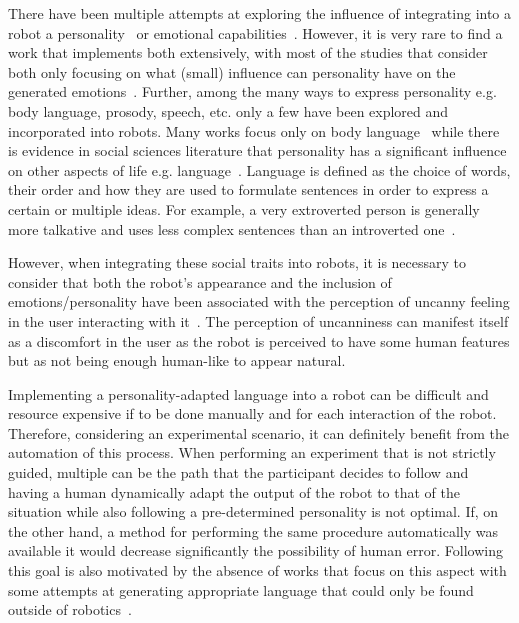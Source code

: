 \documentclass[nomenclature, english, biblatex]{kththesis}
\begin{document}
There have been multiple attempts at exploring the influence of integrating into a robot a personality~\cite{aly2013model, andriella2020have} or emotional capabilities~\cite{brianEmotions, desire, cozmoEmotions}. However, it is very rare to find a work that implements both extensively, with most of the studies that consider both only focusing on what (small) influence can personality have on the generated emotions~\cite{moshkina2011tame, han2012robotic}. Further, among the many ways to express personality e.g. body language, prosody, speech, etc. only a few have been explored and incorporated into robots. Many works focus only on body language~\cite{aly2013model, moshkina2011tame} while there is evidence in social sciences literature that personality has a significant influence on other aspects of life e.g. language~\cite{pennebaker1999linguistic, furnham1990language, thorne1987press, heylighen2002variation, dewaele1999extraversion}. Language is defined as the choice of words, their order and how they are used to formulate sentences in order to express a certain or multiple ideas. For example, a very extroverted person is generally more talkative and uses less complex sentences than an introverted one~\cite{pennebaker1999linguistic, furnham1990language}.

However, when integrating these social traits into robots, it is necessary to consider that both the robot's appearance and the inclusion of emotions/personality have been associated with the perception of uncanny feeling in the user interacting with it~\cite{paetzel2021influence, walters2008avoiding, makarainen2014exaggerating}. The perception of uncanniness can manifest itself as a discomfort in the user as the robot is perceived to have some human features but as not being enough human-like to appear natural. 

Implementing a personality-adapted language into a robot can be difficult and resource expensive if to be done manually and for each interaction of the robot. Therefore, considering an experimental scenario, it can definitely benefit from the automation of this process. When performing an experiment that is not strictly guided, multiple can be the path that the participant decides to follow and having a human dynamically adapt the output of the robot to that of the situation while also following a pre-determined personality is not optimal. If, on the other hand, a method for performing the same procedure automatically was available it would decrease significantly the possibility of human error. %
Following this goal is also motivated by the absence of works that focus on this aspect with some attempts at generating appropriate language that could only be found outside of robotics~\cite{mairesse2007personage, mairesse2011controlling}. 
\end{document}
